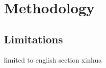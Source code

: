 \chapter{Methodology}\label{chap:methodology}

\section{Limitations}\label{sec:limits}

limited to english section xinhua

